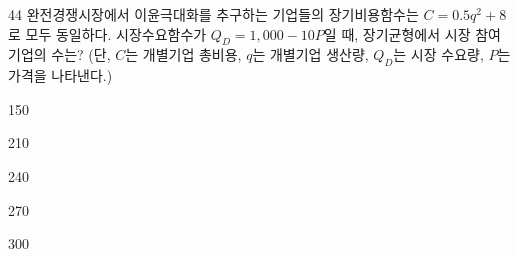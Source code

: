 \begin{question}{44}
완전경쟁시장에서 이윤극대화를 추구하는 기업들의 장기비용함수는 $C=0.5q^{2}+8$로 모두 동일하다. 시장수요함수가 $Q_{D}=1{,}000-10P$일 때, 장기균형에서 시장 참여 기업의 수는? (단, $C$는 개별기업 총비용, $q$는 개별기업 생산량, $Q_{D}$는 시장 수요량, $P$는 가격을 나타낸다.)
\begin{choices}
  \item 150
  \item 210
  \item 240
  \item 270
  \item 300
\end{choices}
\end{question}

